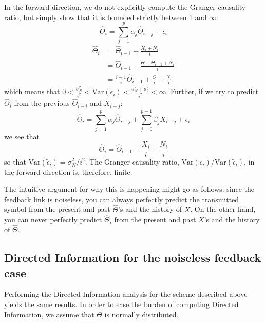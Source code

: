 \documentclass[letterpaper, 10pt, conference]{ieeeconf}
\begin{document}
In the forward direction, we do not explicitly compute the Granger causality ratio, but simply show that it is bounded strictly between 1 and $\infty$:
\begin{equation}
	\widehat\Theta_i = \sum_{j=1}^p{\alpha_j \widehat\Theta_{i-j}} + \epsilon_i \label{eq:ar-model-theta-theta}
\end{equation}
\begin{align*}
	\widehat\Theta_i &= \widehat\Theta_{i-1} + \frac{X_i + N_i}{i} \\
					 &= \widehat\Theta_{i-1} + \frac{\Theta - \widehat\Theta_{i-1} + N_i}{i} \\
					 &= \frac{i-1}{i} \widehat\Theta_{i-1} + \frac{\Theta}{i} + \frac{N_i}{i}
\end{align*}
which means that $0 < \frac{\sigma_N^2}{i^2} < \text{Var}(\epsilon_i) < \frac{\sigma_N^2 + \sigma_\theta^2}{i^2} < \infty$.
Further, if we try to predict $\widehat\Theta_i$ from the previous $\widehat\Theta_{i-i}$ and $X_{i-j}$:
\begin{equation}
	\widehat\Theta_i = \sum_{j=1}^{p}{\alpha_j \widehat\Theta_{i-j}} + \sum_{j=0}^{p-1}{\beta_j X_{i-j}} + \tilde\epsilon_i \label{eq:ar-model-theta-theta-x}
\end{equation}
we see that
\begin{equation*}
	\widehat\Theta_i = \widehat\Theta_{i-1} + \frac{X_i}{i} + \frac{N_i}{i}
\end{equation*}
so that $\text{Var}(\tilde\epsilon_i) = \sigma_N^2/i^2$. The Granger causality ratio, $\text{Var}(\epsilon_i) / \text{Var}(\tilde\epsilon_i)$, in the forward direction is, therefore, finite.

The intuitive argument for why this is happening might go as follows: since the feedback link is noiseless, you can always perfectly predict the transmitted symbol from the present and past $\widehat\Theta$'s and the history of $X$. On the other hand, you can never perfectly predict $\widehat\Theta_i$ from the present and past $X$'s and the history of $\widehat\Theta$.


\subsection{Directed Information for the noiseless feedback case}
\label{sec:dir-info-noiseless}

Performing the Directed Information analysis for the scheme described above yields the same results. In order to ease the burden of computing Directed Information, we assume that $\Theta$ is normally distributed.
\end{document}
